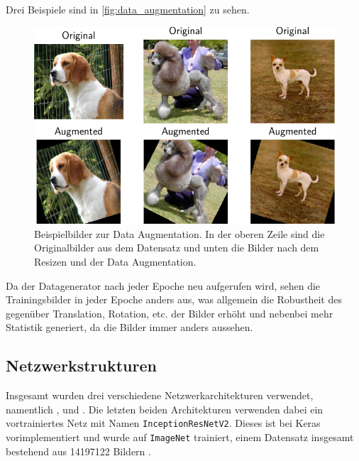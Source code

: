 Drei Beispiele sind in \autoref{fig:data_augmentation} zu sehen.

\begin{figure}
  \centering
  \includegraphics[width=\the\textwidth]{pics/subplot.pdf}
  \caption{Beispielbilder zur Data Augmentation. In der oberen Zeile sind die
  Originalbilder aus dem Datensatz und unten die Bilder nach dem Resizen und der Data Augmentation.}
  \label{fig:data_augmentation}
\end{figure}

Da der Datagenerator nach jeder Epoche neu aufgerufen wird, sehen die
Trainingsbilder in jeder Epoche anders aus, was allgemein die Robustheit des
\CNN gegenüber Translation, Rotation, etc. der Bilder erhöht und nebenbei mehr
Statistik generiert, da die Bilder immer anders aussehen.

\subsection{Netzwerkstrukturen}
\label{sec:netzwerk}
Insgesamt wurden drei verschiedene Netzwerkarchitekturen verwendet, namentlich
\MiniDog, \PreDog und \PreBig. Die letzten beiden Architekturen verwenden dabei
ein vortrainiertes Netz mit Namen \texttt{InceptionResNetV2}. Dieses ist bei
Keras vorimplementiert \cite{inception} und wurde auf \texttt{ImageNet}
trainiert, einem Datensatz insgesamt bestehend aus 14197122 Bildern
\cite{imagenet}.

